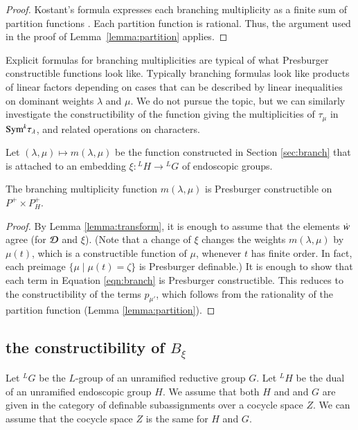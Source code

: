 \begin{proof}  
  Kostant's formula expresses each branching multiplicity as a finite
  sum of partition functions \cite[Theorem ~8.2.1]{goodman}.  Each
  partition function is rational.  Thus, the argument used in the
  proof of Lemma~\ref{lemma:partition} applies.
\end{proof}

\begin{remark}
  Explicit formulas for branching multiplicities are typical of what
  Presburger constructible functions look like.  Typically branching
  formulas look like products of linear factors depending on cases
  that can be described by linear inequalities on dominant weights
  $\lambda$ and $\mu$.  We do not pursue the topic, but we can
  similarly investigate the constructibility of the function giving
  the multiplicities of $\tau_\mu$ in ${\operatorname{Sym}}^k \tau_\lambda$, and
  related operations on characters.
\end{remark}

Let $(\lambda,\mu)\mapsto m(\lambda,\mu)$ be the function constructed
in Section \ref{sec:branch} that is attached to an embedding
$\xi:{}^LH\to {}^LG$ of endoscopic groups.

\begin{lemma}\label{lemma:branch} 
  The branching multiplicity function $m(\lambda,\mu)$ is Presburger
  constructible on $P^+\times P_H^+$.
\end{lemma}

\begin{proof} 
  By Lemma \ref{lemma:transform}, it is enough to assume that the
  elements $\dot w$ agree (for $\mathcal D$ and $\xi$).  (Note that a change of
  $\xi$ changes the weights $m(\lambda,\mu)$ by $\mu(t)$, which is a
  constructible function of $\mu$, whenever $t$ has finite order.  In
  fact, each preimage $\{\mu\mid \mu(t) =\zeta\}$ is Presburger
  definable.)  It is enough to show that each term in Equation
  \ref{eqn:branch} is Presburger constructible.  This reduces to the
  constructibility of the terms $p_{\mu'}$, which follows from the
  rationality of the partition function (Lemma \ref{lemma:partition}).
\end{proof}


\subsection{the constructibility of $B_\xi$}\label{sec:B}

Let ${}^LG$ be the $L$-group of an unramified reductive group
$G$.  Let ${}^LH$ be the dual of an unramified endoscopic group $H$.
We assume that both $H$ and and $G$ are given in the category of
definable subassignments over a cocycle space $Z$.  We can assume that
the cocycle space $Z$ is the same for $H$ and $G$.

